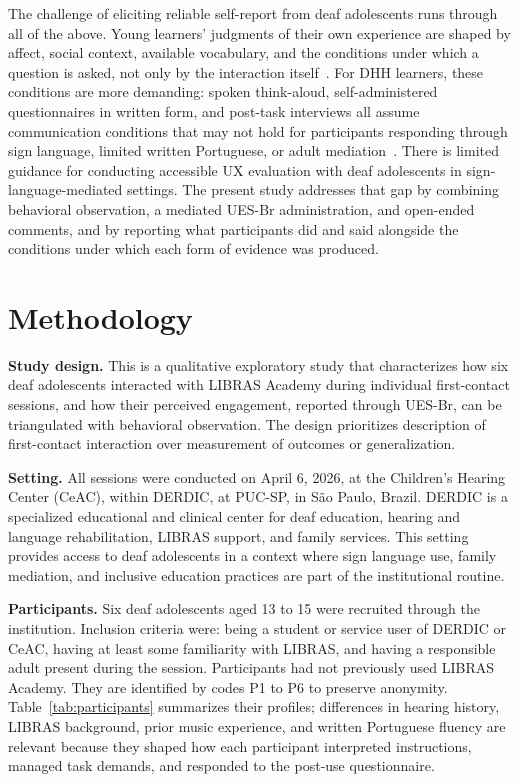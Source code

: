 \documentclass{llncs}
\begin{document}
The challenge of eliciting reliable self-report from deaf adolescents runs through all of
the above. Young learners' judgments of their own experience are shaped by
affect, social context, available vocabulary, and the conditions under which a question
is asked, not only by the interaction itself~\cite{rocha2023metacog,vanloon2021}. For DHH
learners, these conditions are more demanding: spoken think-aloud, self-administered
questionnaires in written form, and post-task interviews all assume communication
conditions that may not hold for participants responding through sign language, limited
written Portuguese, or adult mediation~\cite{albalhareth2022}. There is limited guidance
for conducting accessible UX evaluation with deaf adolescents in
sign-language-mediated settings. The present study addresses that gap by
combining behavioral observation, a mediated UES-Br administration, and open-ended
comments, and by reporting what participants did and said alongside the conditions under which each form of evidence was produced.

\section{Methodology}

\textbf{Study design.} This is a qualitative exploratory study that characterizes how six
deaf adolescents interacted with LIBRAS Academy during individual first-contact sessions,
and how their perceived engagement, reported through UES-Br, can be triangulated with
behavioral observation. The design prioritizes description of first-contact interaction over measurement of outcomes or generalization.

\textbf{Setting.} All sessions were conducted on April 6, 2026, at the Children's
Hearing Center (CeAC), within DERDIC, at PUC-SP, in São Paulo, Brazil. DERDIC is a specialized educational and clinical center for deaf education, hearing and language rehabilitation, LIBRAS support, and family services. This setting provides access to deaf adolescents in a
context where sign language use, family mediation, and inclusive education practices are
part of the institutional routine.

\textbf{Participants.} Six deaf adolescents aged 13 to 15 were recruited through the
institution. Inclusion criteria were: being a student or service user of DERDIC or CeAC,
having at least some familiarity with LIBRAS, and having a responsible adult present
during the session. Participants had not previously used LIBRAS Academy. They are
identified by codes P1 to P6 to preserve anonymity. Table~\ref{tab:participants}
summarizes their profiles; differences in hearing history, LIBRAS background, prior music experience, and written Portuguese fluency are relevant because they shaped
how each participant interpreted instructions, managed task demands, and responded to the
post-use questionnaire.
\end{document}
